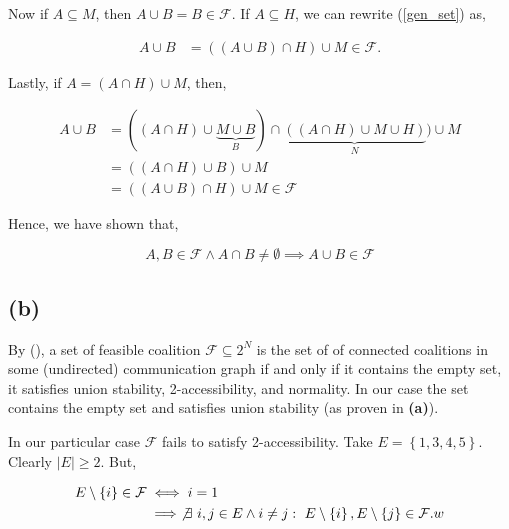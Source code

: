 \documentclass[american]{scrartcl}
\newcommand{\set}[1]{\left\{#1\right\}}
\newcommand{\abs}[1]{\left\lvert #1 \right\rvert}
\begin{document}
Now if $A \subseteq M$, then $A \cup B = B \in \mathcal{F}$. If $A \subseteq H$, we can rewrite (\ref{gen_set}) as,

\begin{equation}
    \begin{split}
        A \cup B &= ((A \cup B) \cap H) \cup M \in \mathcal{F}.
    \end{split}
\end{equation}

Lastly, if $A = (A \cap H) \cup M$, then,

\begin{equation}
    \begin{split}
        A \cup B &= ((A \cap H) \cup \underbrace{M \cup B}_{B}) \cap \underbrace{((A \cap H) \cup M \cup H)}_{N}) \cup M \\
        &= ((A \cap H) \cup B) \cup M \\
        &= ((A \cup B) \cap H) \cup M \in \mathcal{F}
    \end{split}
\end{equation}

Hence, we have shown that,

\begin{equation}
    A, B \in \mathcal{F} \land A \cap B \neq \emptyset \implies A \cup B \in \mathcal{F}
\end{equation}

\subsection*{(b)}

By \citeauthor{brink} (\citeyear{brink}), a set of feasible coalition $\mathcal{F} \subseteq 2^N$ is the set of of connected coalitions in some (undirected) communication graph if and only if it contains the empty set, it satisfies union stability, 2-accessibility, and normality. In our case the set contains the empty set and satisfies union stability (as proven in \textbf{(a)}).

In our particular case $\mathcal{F}$ fails to satisfy 2-accessibility. Take $E = \set{1, 3, 4, 5}$. Clearly $\abs{E} \geq 2$. But,

\begin{equation}
    \begin{split}
        E \setminus \set{i} \in \mathcal{F} &\iff i = 1  \\
        &\implies \not\exists \ i, j \in E \land i \neq j: \ E \setminus \set{i}, E \setminus \set{j} \in \mathcal{F}.w
    \end{split}
\end{equation}

\newpage
\printbibliography
\end{document}
